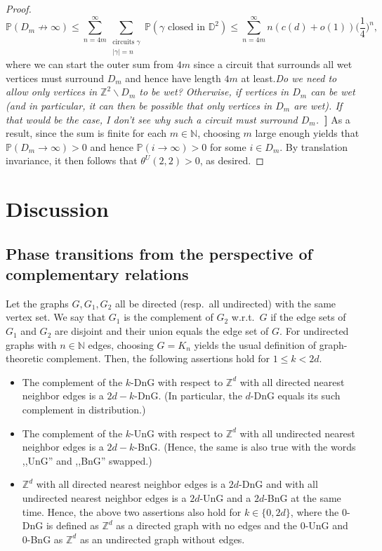 \documentclass{article}
\newcommand{\N}{\mathbb{N}}
\theoremstyle{definition}
\renewcommand{\P}{\mathbb{P}}
\newcommand{\1}{\mathbbm{1}}
\newcommand{\0}{\mathbf{o}}
\newcommand{\Z}{\mathbb{Z}}
\newcommand*{\be}{\begin{equation}}
\newcommand*{\ee}{\end{equation}}
\newcommand{\D}{\mathbb D}
\newcommand{\basc}[1]{{\color{blue}{ \bf [~Bas:\ }\emph{#1}\textbf{~]}}}
\begin{document}
\begin{proof}
    \be 
    \P(D_m \not\to \infty )\leq \sum_{n=4m}^\infty \sum_{\substack{\text{circuits }\gamma \\ |\gamma|=n}}\P(\gamma\text{ closed in }\D^2)\leq \sum_{n=4m}^\infty n(c(d)+o(1))\Big(\frac14\Big)^n,
    \ee 
    where we can start the outer sum from $4m$ since a circuit that surrounds all wet vertices must surround $D_m$ and hence have length $4m$ at least.\basc{Do we need to allow only vertices in $\Z^2\backslash D_m$ to be wet? Otherwise, if vertices in $D_m$ can be wet (and in particular, it can then be possible that \emph{only} vertices in $D_m$ are wet). If that would be the case, I don't see why such a circuit must surround $D_m$.} 
    As a result, since the sum is finite for each $m\in\N$, choosing $m$ large enough yields that $\P(D_m\to \infty)>0$ and hence $\P(i\to \infty)>0$ for some $i\in D_m$. By translation invariance, it then follows that $\theta^U(2,2)>0$, as desired.
\end{proof}



\section{Discussion}\label{sec:discussion}
\subsection{Phase transitions from the perspective of complementary relations}\label{sec:phases}
Let the graphs $G,G_1,G_2$ all be directed (resp.\ all undirected) with the same vertex set. We say that $G_1$ is the complement of $G_2$ w.r.t.\ $G$ if the edge sets of $G_1$ and $G_2$ are disjoint and their union equals the edge set of $G$. For undirected graphs with $n \in \N$ edges, choosing $G=K_n$ yields the usual definition of graph-theoretic complement. Then, the following assertions hold for $1 \leq k < 2d$.
\begin{itemize}
    \item The complement of the $k$-DnG with respect to $\Z^d$ with all directed nearest neighbor edges is a $2d-k$-DnG. (In particular, the $d$-DnG equals its such complement in distribution.)
    \item The complement of the $k$-UnG with respect to $\Z^d$ with all undirected nearest neighbor edges is a $2d-k$-BnG. (Hence, the same is also true with the words ,,UnG'' and ,,BnG'' swapped.) 
    \item $\Z^d$ with all directed nearest neighbor edges is a $2d$-DnG and with all undirected nearest neighbor edges is a $2d$-UnG and a $2d$-BnG at the same time. Hence, the above two assertions also hold for $k \in \{ 0, 2d\}$, where the 0-DnG is defined as $\Z^d$ as a directed graph with no edges and the 0-UnG and 0-BnG as $\Z^d$ as an undirected graph without edges.
\end{itemize}
\end{document}
